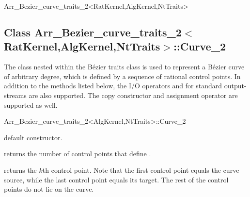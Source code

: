 \begin{ccRefClass}{Arr_Bezier_curve_traits_2<RatKernel,AlgKernel,NtTraits>}

\ccIsModel

\ccTypes



\subsection*{Class
         Arr\_Bezier\_curve\_traits\_2$<$RatKernel,AlgKernel,NtTraits$>$::Curve\_2}

The  class nested within the B\'ezier traits class is used
to represent a B\'ezier curve of arbitrary degree, which is defined by a
sequence of rational control points. In addition to the methods listed
below, the I/O operators  and  for
standard output-streams are also supported. The copy constructor and
assignment operator are supported as well.

\begin{ccClass}{Arr_Bezier_curve_traits_2<AlgKernel,NtTraits>::Curve_2}
% 
\ccCreation
{}

  {default constructor.}


\ccAccessFunctions

  {returns the number of control points that define \ccVar.}

  {returns the $k$th control point. Note that the first control point equals
   the curve source, while the last control point equals its target. The rest
   of the control points do not lie on the curve.
   }


\end{ccClass}
\end{ccRefClass}
